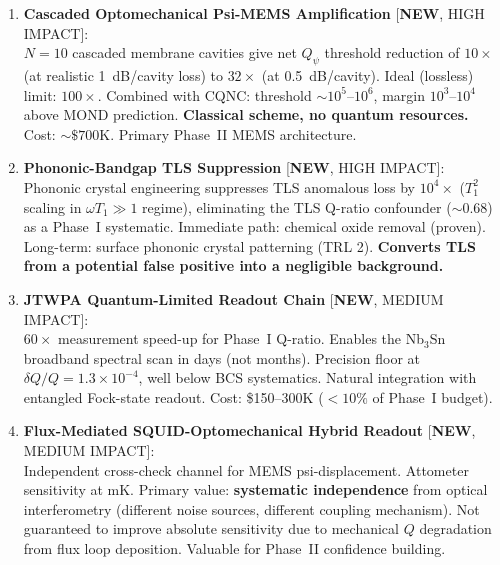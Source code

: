 \documentclass[11pt]{article}
\newcommand{\ee}[1]{\times 10^{#1}}
\newcommand{\Qpsi}{Q_\psi}
\theoremstyle{definition}
\theoremstyle{remark}
\begin{document}
\begin{tcolorbox}[colback=green!5!white, colframe=green!50!black,
  title=\textbf{W4i14 FINDINGS RANKED BY PROGRAMME IMPACT}]

\begin{enumerate}

\item \textbf{Cascaded Optomechanical Psi-MEMS Amplification}
  [\textbf{NEW}, HIGH IMPACT]:\\
  $N = 10$ cascaded membrane cavities give net $\Qpsi$ threshold
  reduction of $10\times$ (at realistic 1~dB/cavity loss) to
  $32\times$ (at 0.5~dB/cavity). Ideal (lossless) limit: $100\times$.
  Combined with CQNC: threshold $\sim 10^5$--$10^6$, margin
  $10^3$--$10^4$ above MOND prediction. \textbf{Classical scheme,
  no quantum resources.} Cost: $\sim\$700$K. Primary Phase~II
  MEMS architecture.

\item \textbf{Phononic-Bandgap TLS Suppression}
  [\textbf{NEW}, HIGH IMPACT]:\\
  Phononic crystal engineering suppresses TLS anomalous loss by
  $10^4\times$ ($T_1^2$ scaling in $\omega T_1 \gg 1$ regime),
  eliminating the TLS Q-ratio confounder ($\sim 0.68$) as a
  Phase~I systematic. Immediate path: chemical oxide removal
  (proven). Long-term: surface phononic crystal patterning
  (TRL 2). \textbf{Converts TLS from a potential false positive
  into a negligible background.}

\item \textbf{JTWPA Quantum-Limited Readout Chain}
  [\textbf{NEW}, MEDIUM IMPACT]:\\
  $60\times$ measurement speed-up for Phase~I Q-ratio. Enables
  the Nb$_3$Sn broadband spectral scan in days (not months).
  Precision floor at $\delta Q/Q = 1.3\ee{-4}$, well below
  BCS systematics. Natural integration with entangled Fock-state
  readout. Cost: \$150--300K ($< 10\%$ of Phase~I budget).

\item \textbf{Flux-Mediated SQUID-Optomechanical Hybrid Readout}
  [\textbf{NEW}, MEDIUM IMPACT]:\\
  Independent cross-check channel for MEMS psi-displacement.
  Attometer sensitivity at mK. Primary value: \textbf{systematic
  independence} from optical interferometry (different noise sources,
  different coupling mechanism). Not guaranteed to improve absolute
  sensitivity due to mechanical $Q$ degradation from flux loop
  deposition. Valuable for Phase~II confidence building.


\end{enumerate}
\end{tcolorbox}
\end{document}
